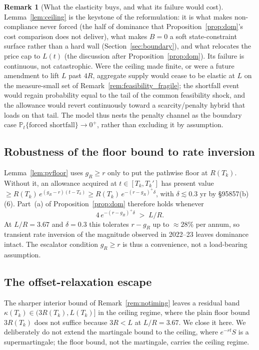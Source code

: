 \documentclass[11pt,letterpaper]{article}
\theoremstyle{plain}
\theoremstyle{definition}
\newtheorem{remark}[theorem]{Remark}
\newcommand{\Prob}{\mathbb{P}}               %
\numberwithin{equation}{section}
\begin{document}
\begin{remark}[What the elasticity buys, and what its failure would cost]\label{rem:ceiling-degrade}
Lemma~\ref{lem:ceiling} is the keystone of the reformulation: it is what makes non-compliance never forced (the half of dominance that Proposition~\ref{prop:dom}'s cost comparison does not deliver), what makes $B=0$ a soft state-constraint surface rather than a hard wall (Section~\ref{sec:boundary}), and what relocates the price cap to $L(t)$ (the discussion after Proposition~\ref{prop:dom}). Its failure is continuous, not catastrophic. Were the ceiling made finite, or were a future amendment to lift $L$ past $4R$, aggregate supply would cease to be elastic at $L$ on the measure-small set of Remark~\ref{rem:feasibility_fragile}; the shortfall event would regain probability equal to the tail of the common feasibility shock, and the allowance would revert continuously toward a scarcity/penalty hybrid that loads on that tail. The model thus nests the penalty channel as the boundary case $\Prob_t\{\text{forced shortfall}\}\to 0^{+}$, rather than excluding it by assumption.
\end{remark}

\subsection{Robustness of the floor bound to rate inversion}

Lemma~\ref{lem:pvfloor} uses $g_R\ge r$ only to put the pathwise floor at $R(T_k)$. Without it, an allowance acquired at $t\in[T_k,T_k']$ has present value $\ge R(T_k)\,e^{(g_R-r)(t-T_k)}\ge R(T_k)\,e^{-(r-g_R)^{+}\delta}$, with
$\delta\lesssim 0.3$ yr by \S95857(b)(6). Part~(a) of Proposition~\ref{prop:dom} therefore holds whenever
\[
4\,e^{-(r-g_R)^{+}\delta} \;>\; L/R .
\]
At $L/R=3.67$ and $\delta=0.3$ this tolerates $r-g_R$ up to $\approx 28\%$ per annum, so transient rate inversion of the magnitude observed in 2022--23 leaves dominance intact. The escalator condition $g_R\ge r$ is thus a convenience, not a load-bearing assumption.

\subsection{The offset-relaxation escape}

The sharper interior bound of Remark~\ref{rem:notiming} leaves a residual band $\kappa(T_k)\in(3R(T_k),L(T_k)]$ in the ceiling regime, where the plain floor bound $3R(T_k)$ does not suffice because $3R<L$ at $L/R=3.67$. We close it here. We deliberately do not extend the martingale bound to the ceiling, where $e^{-rt}S$ is a supermartingale; the floor bound, not the martingale, carries the ceiling regime.
\end{document}
